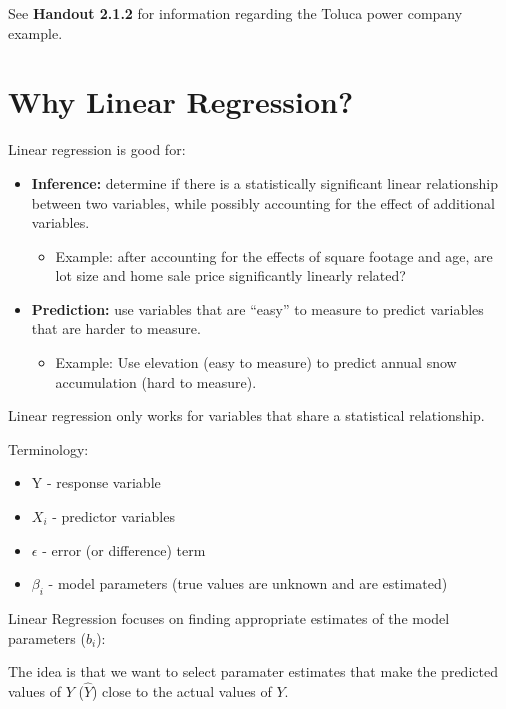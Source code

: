 \documentclass[12pt]{notes}
\begin{document}

See \textbf{Handout 2.1.2} for information regarding the Toluca power company example.

\section{Why Linear Regression?}

\nspace
Linear regression is good for: 
\begin{itemize}
\item \textbf{Inference:} determine if there is a statistically significant linear relationship between two variables, while possibly accounting for the effect of additional variables. 
\begin{itemize}
\item Example: after accounting for the effects of square footage and age, are lot size and home sale price significantly linearly related?  
\end{itemize} 
\item \textbf{Prediction:} use variables that are ``easy'' to measure to predict variables that are harder to measure.  
\begin{itemize}
\item Example: Use elevation (easy to measure) to predict annual snow accumulation (hard to measure). 
\end{itemize} 
\end{itemize}

\nspace
Linear regression only works for variables that share a statistical relationship.

\nspace
Terminology: 

\begin{itemize}
\item Y - response variable
\item $X_i$ - predictor variables
\item $\epsilon$ - error (or difference) term
\item $\beta_i$ - model parameters (true values are unknown and are estimated)
\end{itemize}

\nspace
Linear Regression focuses on finding appropriate estimates of the model parameters ($b_i$):

\nspace
The idea is that we want to select paramater estimates that make the predicted values of $Y$ ($\hat{Y}$) close to the actual values of $Y$.
\end{document}
